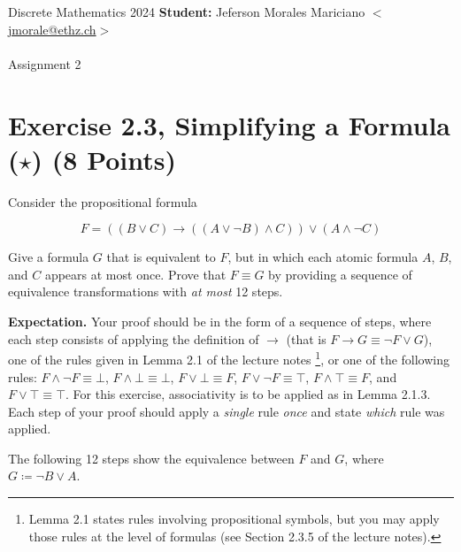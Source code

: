 \documentclass[unicode,11pt,a4paper,oneside,numbers=endperiod,openany]{scrartcl}
\begin{document}
\setassignment
{}

\serieheader
{Discrete Mathematics}
{2024}
{%
\textbf{Student:} Jeferson Morales Mariciano 
\href{mailto:jmorale@ethz.ch}{\(<\)jmorale@ethz.ch\(>\)} \\\\}
{\vspace{-1cm}}%
{Assignment 2}{}

\section{Exercise 2.3, Simplifying a Formula (\(\star\)) \hfill (8 Points)}

Consider the propositional formula

\[
F = \left( (B \lor C) \to ((A \lor \neg B) \land C) \right) \lor (A \land \neg C)
\]

\noindent Give a formula \( G \) that is equivalent to \( F \), but in which each atomic formula \( A \), \( B \), and \( C \)
appears at most once. Prove that \( F \equiv G \) by providing a sequence of equivalence transformations 
with \textit{at most} 12 steps.

\noindent \textbf{Expectation.} 
Your proof should be in the form of a sequence of steps, where each step
consists of applying the definition of \( \to \) 
(that is \( F \to G \equiv \neg F \lor G \)), 
one of the rules given in Lemma 2.1 of the lecture notes 
\footnote{Lemma 2.1 states rules involving propositional symbols, 
but you may apply those rules at the level of formulas 
(see Section 2.3.5 of the lecture notes).}, 
or one of the following rules: 
\( F \land \neg F \equiv \bot \), 
\( F \land \bot \equiv \bot \), 
\( F \lor \bot \equiv F \), 
\( F \lor \neg F \equiv \top \), 
\( F \land \top \equiv F \), 
and \( F \lor \top \equiv \top \). 
For this exercise, associativity is to be applied as in Lemma 2.1.3. 
Each step of your proof should apply a \textit{single} rule \textit{once} 
and state \textit{which} rule was applied.
\\\newline

The following 12 steps show the equivalence between \( F \) and \( G \), 
where \( G  \coloneq \neg B \lor A \).
\end{document}
